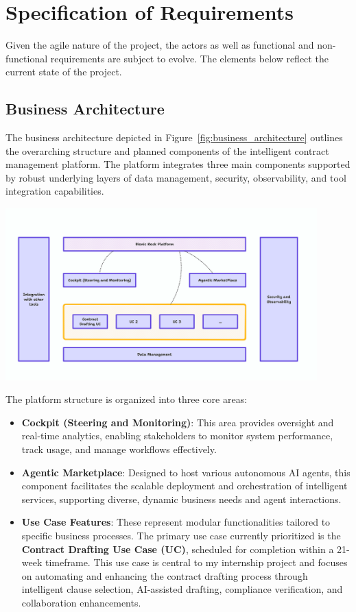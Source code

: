 \section{Specification of Requirements}
Given the agile nature of the project, the actors as well as functional and non-functional requirements are subject to evolve. The elements below reflect the current state of the project.

\subsection{Business Architecture}
The business architecture depicted in Figure~\ref{fig:business_architecture} outlines the overarching structure and planned components of the intelligent contract management platform. The platform integrates three main components supported by robust underlying layers of data management, security, observability, and tool integration capabilities.

\begin{center}
    \centering
    \includegraphics[width=0.9\textwidth]{Images/Business Architecture.png}
     \cite{business_architecture}
    \label{fig:business_architecture}
\end{center}

The platform structure is organized into three core areas:

\begin{itemize}
\item \textbf{Cockpit (Steering and Monitoring)}: This area provides oversight and real-time analytics, enabling stakeholders to monitor system performance, track usage, and manage workflows effectively.
\item \textbf{Agentic Marketplace}: Designed to host various autonomous AI agents, this component facilitates the scalable deployment and orchestration of intelligent services, supporting diverse, dynamic business needs and agent interactions.
\item \textbf{Use Case Features}: These represent modular functionalities tailored to specific business processes. The primary use case currently prioritized is the \textbf{Contract Drafting Use Case (UC)}, scheduled for completion within a 21-week timeframe. This use case is central to my internship project and focuses on automating and enhancing the contract drafting process through intelligent clause selection, AI-assisted drafting, compliance verification, and collaboration enhancements.
\end{itemize}

